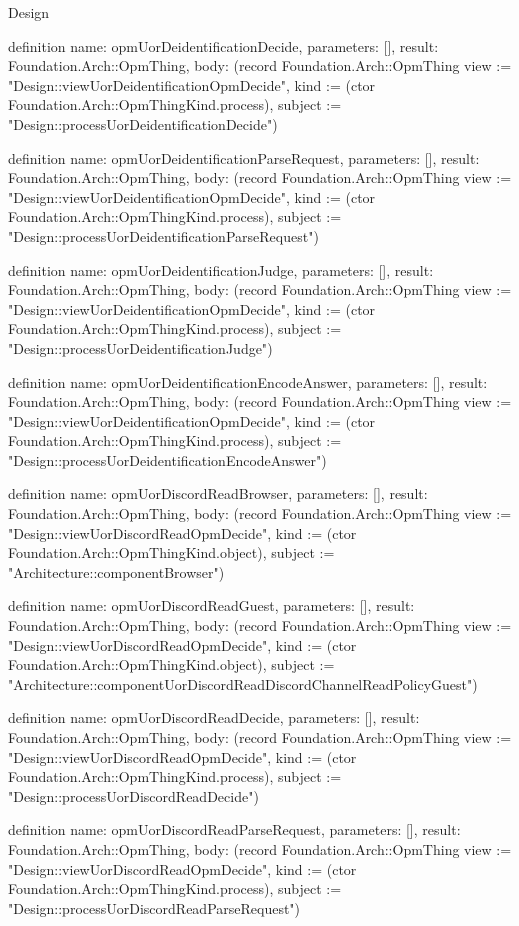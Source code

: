 \begin{lexlean}{Design}
\begin{semanticmodule}
definition{
  name: opmUorDeidentificationDecide,
  parameters: [],
  result: Foundation.Arch::OpmThing,
  body: (record Foundation.Arch::OpmThing {view := "Design::viewUorDeidentificationOpmDecide", kind := (ctor Foundation.Arch::OpmThingKind.process), subject := "Design::processUorDeidentificationDecide"})
}

definition{
  name: opmUorDeidentificationParseRequest,
  parameters: [],
  result: Foundation.Arch::OpmThing,
  body: (record Foundation.Arch::OpmThing {view := "Design::viewUorDeidentificationOpmDecide", kind := (ctor Foundation.Arch::OpmThingKind.process), subject := "Design::processUorDeidentificationParseRequest"})
}

definition{
  name: opmUorDeidentificationJudge,
  parameters: [],
  result: Foundation.Arch::OpmThing,
  body: (record Foundation.Arch::OpmThing {view := "Design::viewUorDeidentificationOpmDecide", kind := (ctor Foundation.Arch::OpmThingKind.process), subject := "Design::processUorDeidentificationJudge"})
}

definition{
  name: opmUorDeidentificationEncodeAnswer,
  parameters: [],
  result: Foundation.Arch::OpmThing,
  body: (record Foundation.Arch::OpmThing {view := "Design::viewUorDeidentificationOpmDecide", kind := (ctor Foundation.Arch::OpmThingKind.process), subject := "Design::processUorDeidentificationEncodeAnswer"})
}

definition{
  name: opmUorDiscordReadBrowser,
  parameters: [],
  result: Foundation.Arch::OpmThing,
  body: (record Foundation.Arch::OpmThing {view := "Design::viewUorDiscordReadOpmDecide", kind := (ctor Foundation.Arch::OpmThingKind.object), subject := "Architecture::componentBrowser"})
}

definition{
  name: opmUorDiscordReadGuest,
  parameters: [],
  result: Foundation.Arch::OpmThing,
  body: (record Foundation.Arch::OpmThing {view := "Design::viewUorDiscordReadOpmDecide", kind := (ctor Foundation.Arch::OpmThingKind.object), subject := "Architecture::componentUorDiscordReadDiscordChannelReadPolicyGuest"})
}

definition{
  name: opmUorDiscordReadDecide,
  parameters: [],
  result: Foundation.Arch::OpmThing,
  body: (record Foundation.Arch::OpmThing {view := "Design::viewUorDiscordReadOpmDecide", kind := (ctor Foundation.Arch::OpmThingKind.process), subject := "Design::processUorDiscordReadDecide"})
}

definition{
  name: opmUorDiscordReadParseRequest,
  parameters: [],
  result: Foundation.Arch::OpmThing,
  body: (record Foundation.Arch::OpmThing {view := "Design::viewUorDiscordReadOpmDecide", kind := (ctor Foundation.Arch::OpmThingKind.process), subject := "Design::processUorDiscordReadParseRequest"})
}


\end{semanticmodule}
\end{lexlean}
